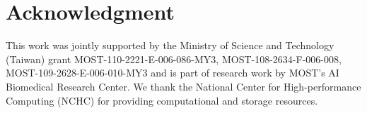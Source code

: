 \documentclass[journal]{IEEEtran}
\begin{document}



\section*{Acknowledgment}
This work was jointly supported by the Ministry of Science and Technology (Taiwan) grant MOST-110-2221-E-006-086-MY3, MOST-108-2634-F-006-008, MOST-109-2628-E-006-010-MY3 and is part of research work by MOST's AI Biomedical Research Center. We thank the National Center for High-performance Computing (NCHC) for providing computational and storage resources.
\end{document}
